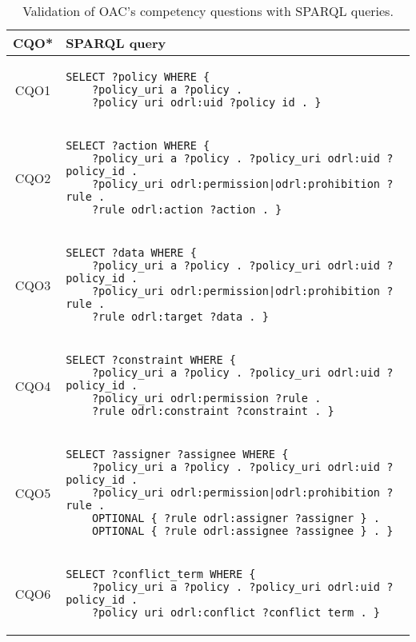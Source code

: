 \begin{table}[htp]
    \centering
    \caption{Validation of OAC's competency questions with SPARQL queries.}
    \label{tab:oac_cq_sparql}
    \footnotesize
    \begin{tabular}{c||l}
        \textbf{CQO*} & \textbf{SPARQL query} \\
        \hline\hline
        CQO1 & \begin{lstlisting}[numbers=none]
SELECT ?policy WHERE {
    ?policy_uri a ?policy . 
    ?policy_uri odrl:uid ?policy_id . } \end{lstlisting} \\
        \hline
        CQO2 & \begin{lstlisting}[numbers=none]
SELECT ?action WHERE {
    ?policy_uri a ?policy . ?policy_uri odrl:uid ?policy_id . 
    ?policy_uri odrl:permission|odrl:prohibition ?rule .
    ?rule odrl:action ?action . } \end{lstlisting} \\
        \hline
        CQO3 & \begin{lstlisting}[numbers=none]
SELECT ?data WHERE {
    ?policy_uri a ?policy . ?policy_uri odrl:uid ?policy_id . 
    ?policy_uri odrl:permission|odrl:prohibition ?rule .
    ?rule odrl:target ?data . } \end{lstlisting} \\
        \hline
        CQO4 & \begin{lstlisting}[numbers=none]
SELECT ?constraint WHERE {
    ?policy_uri a ?policy . ?policy_uri odrl:uid ?policy_id . 
    ?policy_uri odrl:permission ?rule .
    ?rule odrl:constraint ?constraint . } \end{lstlisting} \\
        \hline
        CQO5 & \begin{lstlisting}[numbers=none]
SELECT ?assigner ?assignee WHERE {
    ?policy_uri a ?policy . ?policy_uri odrl:uid ?policy_id . 
    ?policy_uri odrl:permission|odrl:prohibition ?rule .
    OPTIONAL { ?rule odrl:assigner ?assigner } . 
    OPTIONAL { ?rule odrl:assignee ?assignee } . } \end{lstlisting} \\
        \hline
        CQO6 & \begin{lstlisting}[numbers=none]
SELECT ?conflict_term WHERE {
    ?policy_uri a ?policy . ?policy_uri odrl:uid ?policy_id . 
    ?policy_uri odrl:conflict ?conflict_term . } \end{lstlisting} \\
        \hline

\end{tabular}
\end{table}
